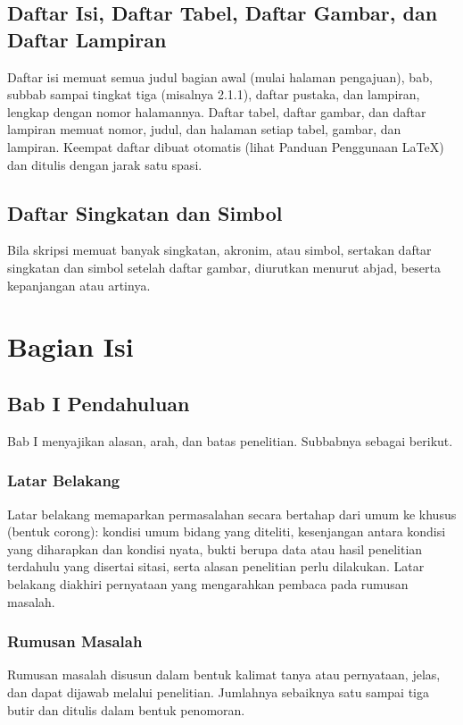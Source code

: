 \subsection{Daftar Isi, Daftar Tabel, Daftar Gambar, dan Daftar Lampiran}
Daftar isi memuat semua judul bagian awal (mulai halaman pengajuan), bab, subbab sampai tingkat tiga (misalnya 2.1.1), daftar pustaka, dan lampiran, lengkap dengan nomor halamannya. Daftar tabel, daftar gambar, dan daftar lampiran memuat nomor, judul, dan halaman setiap tabel, gambar, dan lampiran. Keempat daftar dibuat otomatis (lihat Panduan Penggunaan LaTeX) dan ditulis dengan jarak satu spasi.

\subsection{Daftar Singkatan dan Simbol}
Bila skripsi memuat banyak singkatan, akronim, atau simbol, sertakan daftar singkatan dan simbol setelah daftar gambar, diurutkan menurut abjad, beserta kepanjangan atau artinya.

\section{Bagian Isi}

\subsection{Bab I Pendahuluan}
Bab I menyajikan alasan, arah, dan batas penelitian. Subbabnya sebagai berikut.

\subsubsection{Latar Belakang}
Latar belakang memaparkan permasalahan secara bertahap dari umum ke khusus (bentuk corong): kondisi umum bidang yang diteliti, kesenjangan antara kondisi yang diharapkan dan kondisi nyata, bukti berupa data atau hasil penelitian terdahulu yang disertai sitasi, serta alasan penelitian perlu dilakukan. Latar belakang diakhiri pernyataan yang mengarahkan pembaca pada rumusan masalah.

\subsubsection{Rumusan Masalah}
Rumusan masalah disusun dalam bentuk kalimat tanya atau pernyataan, jelas, dan dapat dijawab melalui penelitian. Jumlahnya sebaiknya satu sampai tiga butir dan ditulis dalam bentuk penomoran.

